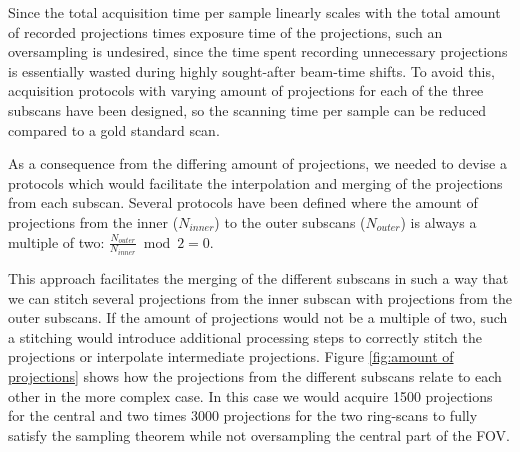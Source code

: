 \cbstart
Since the total acquisition time per sample linearly scales with the total amount of recorded projections times exposure time of the projections, such an oversampling is undesired, since the time spent recording unnecessary projections is essentially wasted during highly sought-after beam-time shifts. To avoid this, acquisition protocols with varying amount of projections for each of the three subscans have been designed, so the scanning time per sample can be reduced compared to a gold standard scan.

As a consequence from the differing amount of projections, we needed to devise a protocols which would facilitate the interpolation and merging of the projections from each subscan. Several protocols have been defined where the amount of projections from the inner ($N_{inner}$) to the outer subscans ($N_{outer}$) is always a multiple of two: $\frac{N_{outer}}{N_{inner}} \bmod 2 = 0$.

This approach facilitates the merging of the different subscans in such a way that we can stitch several projections from the inner subscan with projections from the outer subscans. If the amount of projections would not be a multiple of two, such a stitching would introduce additional processing steps to correctly stitch the projections or interpolate intermediate projections. \cbend Figure \ref{fig:amount of projections} shows how the projections from the different subscans relate to each other in the more complex case. In this case we would acquire 1500 projections for the central and two times 3000 projections for the two ring-scans to fully satisfy the sampling theorem while not oversampling the central part of the FOV. 

\begin{figure*}[htp]
	\centering
	\caption{Number of merged projections for one central- and two ring-scan. We assume that we have obtained 1500 projections for the central scan and thus acquire two times 1500 projections for each of the lateral scans. This enables us to stitch the projections $P_{1_{284}}$ %
 		(red line) from subscan 1 (ring scan, red area), projection $P_{2_{142}}$ %
 		(green line) from subscan 2 (central scan, green area) and projection $P_{3_{283}}$ %
 		(blue line) of subscan 3 (ring scan, blue area) to one big projection $P_{merge_{284}}$ %
		which covers the full FOV. The areas of the three subscans overlap slightly as described above to account for variations in positioning. For illustration purposes we shifted the central projection (green) by \SI{2}{\degree}, otherwise the overlap between these particular projection would not be visible.}%
	\label{fig:amount of projections}%
\end{figure*}

